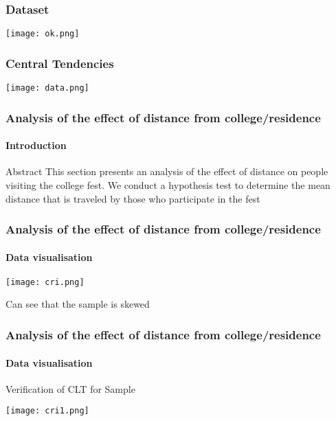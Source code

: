 \documentclass{beamer}
\begin{document}
\begin{frame}
\frametitle{Dataset}
\begin{minipage}{\textwidth}
    \centering
    \texttt{[image: ok.png]}
    \label{fig:enter-label}
\end{minipage}
\end{frame}

\begin{frame}
\frametitle{Central Tendencies}
\begin{minipage}{\textwidth}
    \centering
    \texttt{[image: data.png]}
    \label{fig:enter-label}
\end{minipage}
\end{frame}

\begin{frame}
\frametitle{Analysis of the effect of distance
from college/residence}
\framesubtitle{Introduction}
\begin{block}{Abstract}
This section presents an analysis of the effect of distance on people
visiting the college fest. We conduct a hypothesis test to determine the mean distance
that is traveled by those who participate in the fest
\end{block}
\end{frame}

\begin{frame}
\frametitle{Analysis of the effect of distance
from college/residence}
\framesubtitle{Data visualisation}
\begin{minipage}{\textwidth}
    \centering
    \texttt{[image: cri.png]}
    \label{fig:enter-label}
\end{minipage}
Can see that the sample is skewed
\end{frame}

\begin{frame}
\frametitle{Analysis of the effect of distance
from college/residence}
\framesubtitle{Data visualisation}
Verification of CLT for Sample\\
\vspace{5mm}
\begin{minipage}{\textwidth}
    \centering
    \texttt{[image: cri1.png]}
    \label{fig:enter-label}
\end{minipage}
\end{frame}
\end{document}
